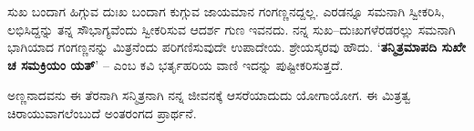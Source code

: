 ಸುಖ ಬಂದಾಗ ಹಿಗ್ಗುವ ದುಃಖ ಬಂದಾಗ ಕುಗ್ಗುವ ಜಾಯಮಾನ ಗಂಗಣ್ಣನದ್ದಲ್ಲ. ಎರಡನ್ನೂ ಸಮನಾಗಿ ಸ್ವೀಕರಿಸಿ, ಲಭಿಸಿದ್ದನ್ನು ತನ್ನ ಸೌಭಾಗ್ಯವೆಂದು ಸ್ವೀಕರಿಸುವ ಆದರ್ಶ ಗುಣ ಇವನದು. ನನ್ನ ಸುಖ–ದುಃಖಗಳೆರಡರಲ್ಲು ಸಮನಾಗಿ ಭಾಗಿಯಾದ ಗಂಗಣ್ಣನನ್ನು ಮಿತ್ರನೆಂದು ಪರಿಗಣಿಸುವುದೇ ಉಪಾದೇಯ. ಶ್ರೇಯಸ್ಕರವು ಹೌದು. ‘\textbf{ತನ್ಮಿತ್ರಮಾಪದಿ ಸುಖೇ ಚ ಸಮಕ್ರಿಯಂ ಯತ್}’ – ಎಂಬ ಕವಿ ಭರ್ತೃಹರಿಯ ವಾಣಿ ಇದನ್ನು ಪುಷ್ಟೀಕರಿಸುತ್ತದೆ.

ಅಣ್ಣನಾದವನು ಈ ತೆರನಾಗಿ ಸನ್ಮಿತ್ರನಾಗಿ ನನ್ನ ಜೀವನಕ್ಕೆ ಆಸರೆಯಾದುದು ಯೋಗಾಯೋಗ. ಈ ಮಿತ್ರತ್ವ ಚಿರಾಯುವಾಗಲೆಂಬುದೆ ಅಂತರಂಗದ ಪ್ರಾರ್ಥನೆ.

\articleend
